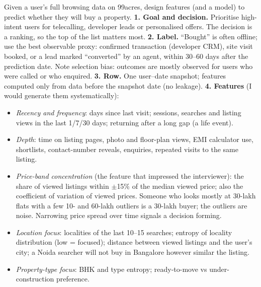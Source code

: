 \begin{qa}{ Given a user's full browsing data on 99acres, design features (and a model) to predict whether they will buy a property.}
\why
\textbf{1. Goal and decision.} Prioritise high-intent users for telecalling, developer leads or personalised offers. The decision is a ranking, so the top of the list matters most.
\textbf{2. Label.} ``Bought'' is often offline; use the best observable proxy: confirmed transaction (developer CRM), site visit booked, or a lead marked ``converted'' by an agent,
within 30--60 days after the prediction date. Note selection bias: outcomes are mostly observed for users who were called or who enquired.
\textbf{3. Row.} One user--date snapshot; features computed only from data before the snapshot date (no leakage).
\textbf{4. Features} (I would generate them systematically):
\begin{itemize}
\item \emph{Recency and frequency}: days since last visit; sessions, searches and listing views in the last 1/7/30 days; returning after a long gap (a life event).
\item \emph{Depth}: time on listing pages, photo and floor-plan views, EMI calculator use, shortlists, contact-number reveals, enquiries, repeated visits to the same listing.
\item \emph{Price-band concentration} (the feature that impressed the interviewer): the share of viewed listings within $\pm$15\% of the median viewed price; also the
  coefficient of variation of viewed prices. Someone who looks mostly at 30-lakh flats with a few 10- and 60-lakh outliers is a 30-lakh buyer; the outliers are noise.
  Narrowing price spread over time signals a decision forming.
\item \emph{Location focus}: localities of the last 10--15 searches; entropy of locality distribution (low = focused); distance between viewed listings and the user's city; a
  Noida searcher will not buy in Bangalore however similar the listing.
\item \emph{Property-type focus}: BHK and type entropy; ready-to-move vs under-construction preference.

\end{itemize}
\end{qa}

